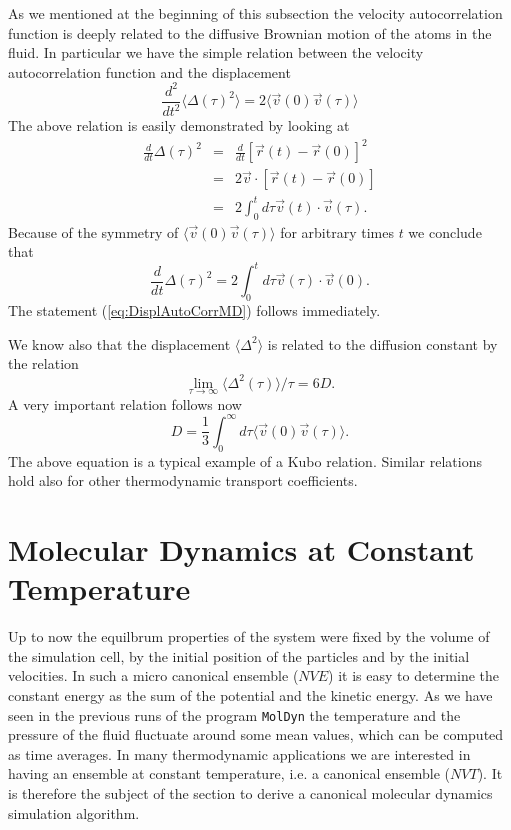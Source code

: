 As we mentioned at the beginning of this subsection the velocity
autocorrelation function is deeply related to the diffusive Brownian motion of
the atoms in the fluid. In particular we have the  simple relation between
the velocity autocorrelation function and the displacement
\begin{equation}
\label{eq:DisplAutoCorrMD}
  \frac{d^2}{dt^2} \langle \Delta(\tau)^2 \rangle =
      2 \langle \vec{v}(0) \vec{v}(\tau) \rangle
\end{equation}
The above relation is easily demonstrated by looking at
\begin{eqnarray*}
  \frac{d}{dt}  \Delta(\tau)^2  
          & = &     \frac{d}{dt} [\vec{r}(t) - \vec{r}(0)]^2 \\
          & = & 2 \vec{v} \cdot [\vec{r}(t) - \vec{r}(0) ]  \\
          & = & 2 \int_0^t d\tau \vec{v}(t) \cdot \vec{v}(\tau).
\end{eqnarray*}
Because of the symmetry of $\langle \vec{v}(0) \vec{v}(\tau) \rangle$ 
for arbitrary times $t$ we conclude that
\begin{displaymath}
  \frac{d}{dt}  \Delta(\tau)^2 = 2 \int_0^t d\tau \vec{v}(\tau) 
          \cdot \vec{v}(0).
\end{displaymath}
The statement (\ref{eq:DisplAutoCorrMD}) follows immediately.

We know also that the displacement $\langle \Delta^2 \rangle$ 
is related to the diffusion
constant by the relation 
\begin{displaymath}
  \lim_{\tau \rightarrow \infty}\langle \Delta^2(\tau) \rangle / \tau = 6D.
\end{displaymath}
A very important relation follows now
\begin{displaymath}
  D = \frac{1}{3} \int_0^{\infty}  d\tau
            \langle \vec{v}(0) \vec{v}(\tau) \rangle .
\end{displaymath}
The above equation is a typical example of a Kubo relation. Similar relations
hold also for other thermodynamic transport coefficients.


\section{Molecular Dynamics at Constant Temperature}
Up to now the equilbrum properties of the system were fixed by the volume of
the simulation cell, by the initial position of the particles and by the
initial velocities. In such a micro canonical ensemble ($NVE$) it is easy to
determine the constant energy as the sum of the potential and the kinetic
energy. As we have seen in the previous runs of the program \verb|MolDyn| the
temperature and the pressure of the fluid fluctuate around some mean values,
which can be computed as time averages. In many thermodynamic applications
we are interested in having an ensemble at constant temperature, i.e. a
canonical ensemble ($NVT$). It is therefore the subject of the section to
derive a canonical molecular dynamics simulation algorithm.

